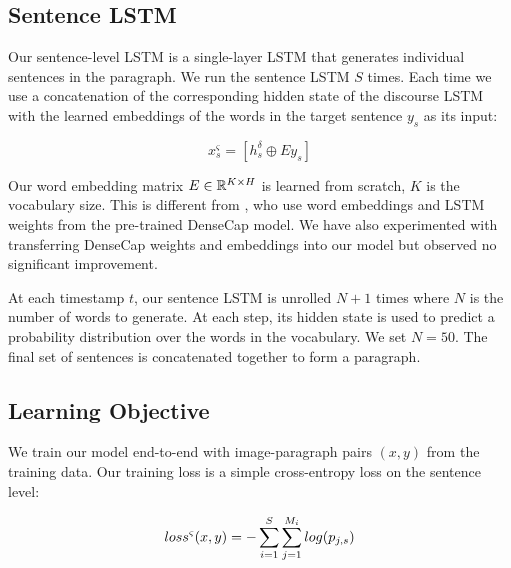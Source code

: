 \documentclass[11pt,a4paper]{article}
\newcommand{\R}{\mathbb{R}}
\begin{document}
\subsection{Sentence LSTM}
Our sentence-level LSTM is a single-layer LSTM that generates individual sentences in the paragraph.
We run the sentence LSTM $S$ times. Each time we use a concatenation of the corresponding hidden state of the discourse LSTM with the learned embeddings of the words in the target sentence $y_s$ as its input:

\begin{equation}
  x^\varsigma_s = [h^\delta_s \oplus Ey_s ]
\end{equation}


Our word embedding matrix $E \in \R\sp{K \times H}$ is learned from scratch, $K$ is the vocabulary size.
This is different from \cite{krause2016hierarchical}, who use word embeddings and LSTM weights from the pre-trained DenseCap model. %
We have also experimented with transferring DenseCap weights and embeddings into our model but observed no significant improvement.

At each timestamp $t$, our sentence LSTM is unrolled $N+1$ times where $N$ is the number of words to generate. At each step, its hidden state is used to predict a probability distribution over the words in the vocabulary. We set $N=50$.
The final set of sentences is concatenated together to form a paragraph.


\subsection{Learning Objective}
We train our model end-to-end with image-paragraph pairs $(x, y)$ from the training data.
Our training loss is a simple cross-entropy loss on the sentence level:

\begin{equation}
  loss\sp{\varsigma}(x, y) = - \sum_{i=1}^{S}\sum_{j=1}^{M_i} log(p_{j,s})
\end{equation}
\end{document}
